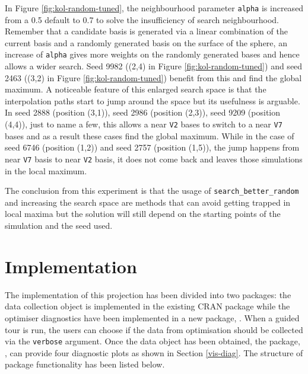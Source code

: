 In Figure \ref{fig:kol-random-tuned}, the neighbourhood parameter
\texttt{alpha} is increased from a 0.5 default to 0.7 to solve the
insufficiency of search neighbourhood. Remember that a candidate basis
is generated via a linear combination of the current basis and a
randomly generated basis on the surface of the sphere, an increase of
\texttt{alpha} gives more weights on the randomly generated bases and
hence allows a wider search. Seed 9982 ((2,4) in Figure
\ref{fig:kol-random-tuned}) and seed 2463 ((3,2) in Figure
\ref{fig:kol-random-tuned}) benefit from this and find the global
maximum. A noticeable feature of this enlarged search space is that the
interpolation paths start to jump around the space but its usefulness is
arguable. In seed 2888 (position (3,1)), seed 2986 (position (2,3)),
seed 9209 (position (4,4)), just to name a few, this allows a near
\texttt{V2} bases to switch to a near \texttt{V7} bases and as a result
these cases find the global maximum. While in the case of seed 6746
(position (1,2)) and seed 2757 (position (1,5)), the jump happens from
near \texttt{V7} basis to near \texttt{V2} basis, it does not come back
and leaves those simulations in the local maximum.

The conclusion from this experiment is that the usage of
\texttt{search\_better\_random} and increasing the search space are
methods that can avoid getting trapped in local maxima but the solution
will still depend on the starting points of the simulation and the seed
used.

\hypertarget{implementation}{%
\section{Implementation}\label{implementation}}

The implementation of this projection has been divided into two
packages: the data collection object is implemented in the existing CRAN
package  \citep{tourr} while the optimiser diagnostics
have been implemented in a new package, . When a guided tour
is run, the users can choose if the data from optimisation should be
collected via the \texttt{verbose} argument. Once the data object has
been obtained, the package, , can provide four diagnostic
plots as shown in Section \ref{vis-diag}. The structure of package
functionality has been listed below.

